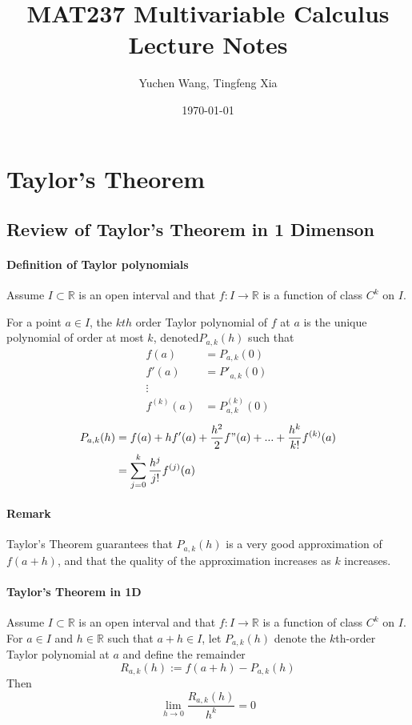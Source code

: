 \documentclass[11pt]{article}
\title{MAT237 Multivariable Calculus \\ Lecture Notes}
\author{Yuchen Wang, Tingfeng Xia}
\date{\today}
\newcommand{\real}[0]{\mathbb{R}}
\begin{document}
    \maketitle
    \tableofcontents
    \newpage
\section{Taylor's Theorem}
\subsection{Review of Taylor's Theorem in 1 Dimenson}
\paragraph{Definition of Taylor polynomials} Assume $I \subset \real$ is an open interval and that $f: I \rightarrow \real$ is a function of class $C^k$ on $I$.

For a point $a\in I$, the $kth$ order Taylor polynomial of $f$ at $a$ is the unique polynomial of order at most $k$, denoted$P_{a,k}(h)$ such that
\begin{align*}
	f(a) &= P_{a,k}(0)\\
	f'(a) &= P'_{a,k}(0)\\
	\vdots\\
	f^{(k)}(a) &= P_{a,k}^{(k)}(0)
\end{align*}
\begin{align*}
	P_{a,k}(h) &= f(a) + hf'(a) + \frac{h^2}{2}f"(a) +...+\frac{h^k}{k!}f^{(k)}(a)\\
	&= \sum_{j=0}^{k}\frac{h^j}{j!}f^{(j)}(a)
\end{align*}
\paragraph{Remark}
Taylor's Theorem guarantees that $P_{a,k}(h)$ is a very good approximation of $f(a+h)$, and that the quality of the approximation increases as $k$ increases.
\paragraph{Taylor's Theorem in 1D}Assume $I \subset \real$ is an open interval and that $f: I \rightarrow \real$ is a function of class $C^k$ on $I$. For $a \in I$ and $h \in \real$ such that $a+h\in I$, let $P_{a,k}(h)$ denote the $k$th-order Taylor polynomial at $a$ and define the remainder
$$R_{a,k}(h) := f(a+h) - P_{a,k}(h)$$
Then $$\lim_{h\rightarrow0}\frac{R_{a,k}(h)}{h^k} = 0$$
\end{document}
